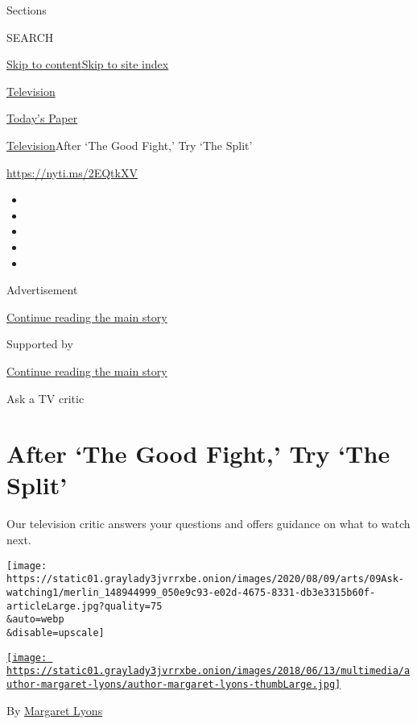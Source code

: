 Sections

SEARCH

\protect\hyperlink{site-content}{Skip to
content}\protect\hyperlink{site-index}{Skip to site index}

\href{https://www.nytimes3xbfgragh.onion/section/arts/television}{Television}

\href{https://myaccount.nytimes3xbfgragh.onion/auth/login?response_type=cookie\&client_id=vi}{}

\href{https://www.nytimes3xbfgragh.onion/section/todayspaper}{Today's
Paper}

\href{/section/arts/television}{Television}\textbar{}After `The Good
Fight,' Try `The Split'

\url{https://nyti.ms/2EQtkXV}

\begin{itemize}
\item
\item
\item
\item
\item
\end{itemize}

Advertisement

\protect\hyperlink{after-top}{Continue reading the main story}

Supported by

\protect\hyperlink{after-sponsor}{Continue reading the main story}

Ask a TV critic

\hypertarget{after-the-good-fight-try-the-split}{%
\section{After `The Good Fight,' Try `The
Split'}\label{after-the-good-fight-try-the-split}}

Our television critic answers your questions and offers guidance on what
to watch next.

\texttt{[image: https://static01.graylady3jvrrxbe.onion/images/2020/08/09/arts/09Ask-watching1/merlin\_148944999\_050e9c93-e02d-4675-8331-db3e3315b60f-articleLarge.jpg?quality=75\\\&auto=webp\\\&disable=upscale]}

\href{https://www.nytimes3xbfgragh.onion/by/margaret-lyons}{\texttt{[image: https://static01.graylady3jvrrxbe.onion/images/2018/06/13/multimedia/author-margaret-lyons/author-margaret-lyons-thumbLarge.jpg]}}

By \href{https://www.nytimes3xbfgragh.onion/by/margaret-lyons}{Margaret
Lyons}

